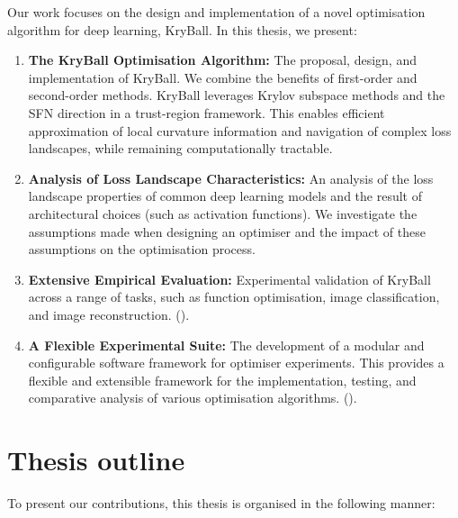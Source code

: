 Our work focuses on the design and implementation of a novel optimisation algorithm for deep learning, KryBall. In this thesis, we present:
\begin{enumerate}
    \item \textbf{The KryBall Optimisation Algorithm:} The proposal, design, and implementation of KryBall. We combine the benefits of first-order and second-order methods. KryBall leverages Krylov subspace methods and the SFN direction in a trust-region framework. This enables efficient approximation of local curvature information and navigation of complex loss landscapes, while remaining computationally tractable.
    \item \textbf{Analysis of Loss Landscape Characteristics:} An analysis of the loss landscape properties of common deep learning models and the result of architectural choices (such as activation functions). We investigate the assumptions made when designing an optimiser and the impact of these assumptions on the optimisation process.
    \item \textbf{Extensive Empirical Evaluation:} Experimental validation of KryBall across a range of tasks, such as function optimisation, image classification, and image reconstruction. 
    (\color{red}{can also add the interpretability work here if needs to be more diverse.}\color{black}).
    \item \textbf{A Flexible Experimental Suite:} The development of a modular and configurable software framework for optimiser experiments. This provides a flexible and extensible framework for the implementation, testing, and comparative analysis of various optimisation algorithms. 
    (\color{red}{while not research --- I do think the current framework is a good software suite for a range of tasks that I haven't seen much for optimiser research (except MLPerf). It's quite easy to use, efficient, and extensible. Happy to remove if it doesn't really count as a contribution.}\color{black}).
\end{enumerate}

\section{Thesis outline}
\label{sec:thesis_outline}

To present our contributions, this thesis is organised in the following manner:

